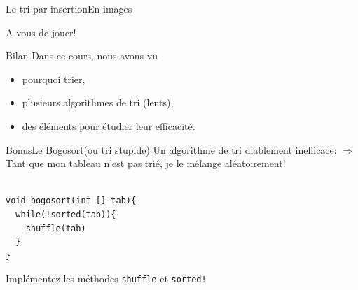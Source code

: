\documentclass[12pt,a4paper]{beamer}
\begin{document}
\begin{frame}{Le tri par insertion}{En images}


\end{frame}




\begin{frame}{A vous de jouer!}

\end{frame}

\begin{frame}{Bilan}
Dans ce cours, nous avons vu
\begin{itemize}
\item pourquoi trier,
\item plusieurs algorithmes de tri (lents),
\item des éléments pour étudier leur efficacité.
\end{itemize}
\end{frame}

\begin{frame}[fragile]{Bonus}{Le Bogosort(ou tri stupide)}
Un algorithme de tri diablement inefficace:\newline
$\Rightarrow$ Tant que mon tableau n'est pas trié, je le mélange aléatoirement!

\pause
\begin{lstlisting}

void bogosort(int [] tab){
  while(!sorted(tab)){
    shuffle(tab)
  }
}
\end{lstlisting}
\pause
Implémentez les méthodes \texttt{shuffle} et \texttt{sorted!}


\end{frame}
\end{document}
